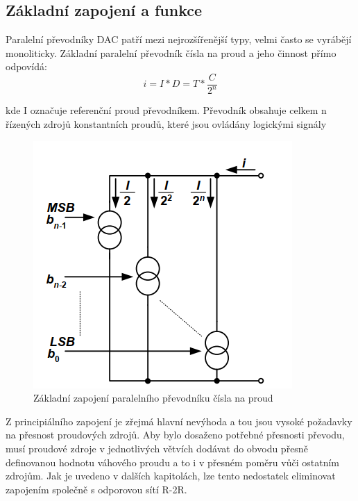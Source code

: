 \subsection{Základní zapojení a funkce}
Paralelní převodníky DAC patří mezi nejrozšířenější typy, velmi často se vyrábějí monoliticky. Základní paralelní převodník čísla na proud a jeho činnost přímo odpovídá:
\begin{equation}
i = I*D=T*\frac{C}{2^n}
\end{equation}

kde I označuje referenční proud převodníkem. Převodník obsahuje celkem n řízených zdrojů konstantních proudů, které jsou ovládány logickými signály

\begin{figure}[h]
   \begin{center}
     \includegraphics[scale=0.6]{images/DAzaklad.png}
   \end{center}
   \caption{Základní zapojení paralelního převodníku čísla na proud}
\end{figure}

Z principiálního zapojení je zřejmá hlavní nevýhoda a tou jsou vysoké požadavky na přesnost proudových zdrojů. Aby bylo dosaženo potřebné přesnosti převodu, musí proudové zdroje v jednotlivých větvích dodávat do obvodu přesně definovanou hodnotu váhového proudu a to i v přesném poměru vůči ostatním zdrojům. Jak je uvedeno v dalších kapitolách, lze tento nedostatek eliminovat zapojením společně s odporovou sítí R-2R.

